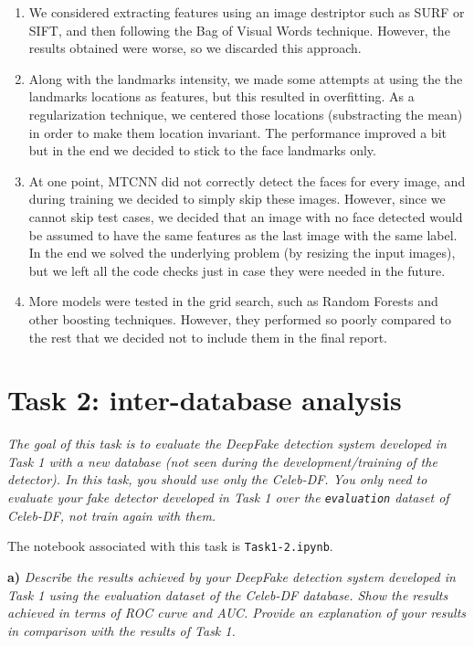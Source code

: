 \documentclass[11pt]{article}
\begin{document}
\begin{enumerate}
  \item We considered extracting features using an image destriptor such as SURF or SIFT, and then following the Bag of Visual Words technique. However, the results obtained were worse, so we discarded this approach.
  \item Along with the landmarks intensity, we made some attempts at using the the landmarks locations as features, but this resulted in overfitting. As a regularization technique, we centered those locations (substracting the mean) in order to make them location invariant. The performance improved a bit but in the end we decided to stick to the face landmarks only.
  \item At one point, MTCNN did not correctly detect the faces for every image, and during training we decided to simply skip these images. However, since we cannot skip test cases, we decided that an image with no face detected would be assumed to have the same features as the last image with the same label. In the end we solved the underlying problem (by resizing the input images), but we left all the code checks just in case they were needed in the future.
  \item More models were tested in the grid search, such as Random Forests and other boosting techniques. However, they performed so poorly compared to the rest that we decided not to include them in the final report.
\end{enumerate}

\section*{Task 2: inter-database analysis}

\textit{The goal of this task is to evaluate the DeepFake detection system developed in Task 1 with a new database (not seen during the development/training of the detector). In this task, you should use only the Celeb-DF. You only need to evaluate your fake detector developed in Task 1 over the \texttt{evaluation} dataset of Celeb-DF, not train again with them.}

The notebook associated with this task is \texttt{Task1-2.ipynb}.

\textbf{a)} \textit{Describe the results achieved by your DeepFake detection system developed in Task 1 using the evaluation dataset of the Celeb-DF database. Show the results achieved in terms of ROC curve and AUC. Provide an explanation of your results in comparison with the results of Task 1.}
\end{document}

